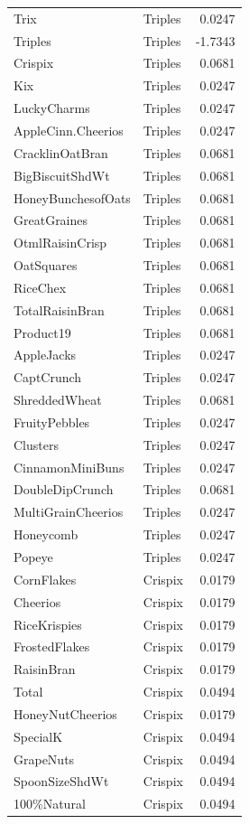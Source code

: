 \begin{longtable}{llr}
Trix & Triples & 0.0247 \\
Triples & Triples & -1.7343 \\
Crispix & Triples & 0.0681 \\
Kix & Triples & 0.0247 \\
LuckyCharms & Triples & 0.0247 \\
AppleCinn.Cheerios & Triples & 0.0247 \\
CracklinOatBran & Triples & 0.0681 \\
BigBiscuitShdWt & Triples & 0.0681 \\
HoneyBunchesofOats & Triples & 0.0681 \\
GreatGraines & Triples & 0.0681 \\
OtmlRaisinCrisp & Triples & 0.0681 \\
OatSquares & Triples & 0.0681 \\
RiceChex & Triples & 0.0681 \\
TotalRaisinBran & Triples & 0.0681 \\
Product19 & Triples & 0.0681 \\
AppleJacks & Triples & 0.0247 \\
CaptCrunch & Triples & 0.0247 \\
ShreddedWheat & Triples & 0.0681 \\
FruityPebbles & Triples & 0.0247 \\
Clusters & Triples & 0.0247 \\
CinnamonMiniBuns & Triples & 0.0247 \\
DoubleDipCrunch & Triples & 0.0681 \\
MultiGrainCheerios & Triples & 0.0247 \\
Honeycomb & Triples & 0.0247 \\
Popeye & Triples & 0.0247 \\
CornFlakes & Crispix & 0.0179 \\
Cheerios & Crispix & 0.0179 \\
RiceKrispies & Crispix & 0.0179 \\
FrostedFlakes & Crispix & 0.0179 \\
RaisinBran & Crispix & 0.0179 \\
Total & Crispix & 0.0494 \\
HoneyNutCheerios & Crispix & 0.0179 \\
SpecialK & Crispix & 0.0494 \\
GrapeNuts & Crispix & 0.0494 \\
SpoonSizeShdWt & Crispix & 0.0494 \\
100\%Natural & Crispix & 0.0494 \\

\end{longtable}

